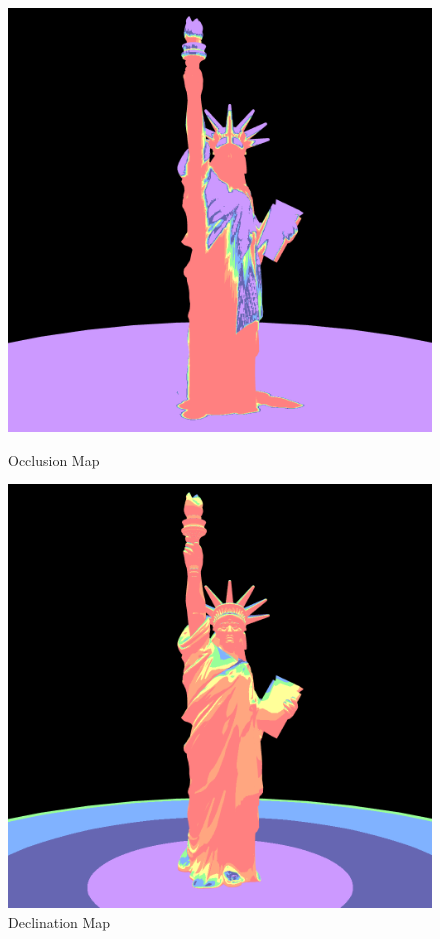 \documentclass{article}
\begin{document}
\begin{figure}[h]
  \centering
  \begin{minipage}{0.45\textwidth}
      \centering
      \includegraphics[width=\textwidth]{images/OcclusionMap.png}
      \caption{Occlusion Map}
      \label{fig:OcclusionMap}
  \end{minipage}\hfill
  \begin{minipage}{0.45\textwidth}
      \centering
      \includegraphics[width=\textwidth]{images/DeclinationMap.png}
      \caption{Declination Map}
      \label{fig:DeclinationMap}
  \end{minipage}
\end{figure}
\end{document}
